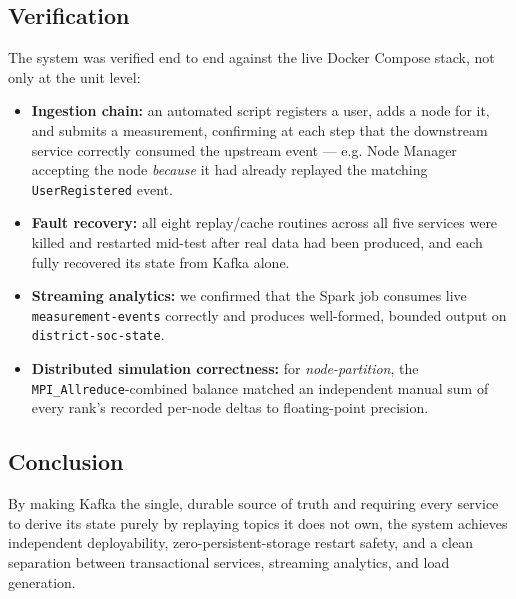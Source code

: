 \subsection*{Verification}
The system was verified end to end against the live Docker Compose stack, not only at the unit
level:
\begin{itemize}
\item \textbf{Ingestion chain:} an automated script registers a user, adds a node for it, and
  submits a measurement, confirming at each step that the downstream service correctly consumed
  the upstream event --- e.g. Node Manager accepting the node \emph{because} it had already
  replayed the matching \texttt{UserRegistered} event.
\item \textbf{Fault recovery:} all eight replay/cache routines across all five services were
  killed and restarted mid-test after real data had been produced, and each fully recovered its
  state from Kafka alone.
\item \textbf{Streaming analytics:} we confirmed that the Spark job consumes live
  \texttt{measurement-events} correctly and produces well-formed, bounded output on
  \texttt{district-soc-state}.
\item \textbf{Distributed simulation correctness:} for \emph{node-partition}, the
  \texttt{MPI\_Allreduce}-combined balance matched an independent manual sum of every rank's
  recorded per-node deltas to floating-point precision.
\end{itemize}

\subsection*{Conclusion}
By making Kafka the single, durable source of truth and requiring every service to derive its
state purely by replaying topics it does not own, the system achieves independent deployability,
zero-persistent-storage restart safety, and a clean separation between transactional services,
streaming analytics, and load generation.
